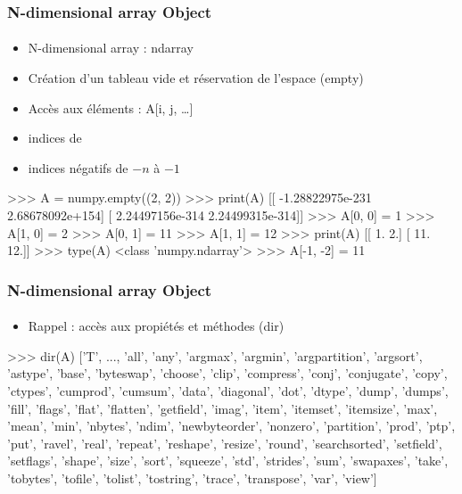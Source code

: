 \begin{frame}[fragile]
\frametitle{N-dimensional array Object}
\framesubtitle{}
\begin{itemize}
 \item N-dimensional array : ndarray
 \item Création d'un tableau vide et réservation de l'espace (empty)
 \item Accès aux éléments : A[i, j, \dots] 
 \item indices de {\color{red}{0 à $n-1$}}
 \item indices négatifs de $-n$ à $-1$
\end{itemize}
\begin{pythonConsole}

>>> A = numpy.empty((2, 2))
>>> print(A)
[[ -1.28822975e-231   2.68678092e+154]
 [  2.24497156e-314   2.24499315e-314]]
>>> A[0, 0] = 1
>>> A[1, 0] = 2
>>> A[0, 1] = 11
>>> A[1, 1] = 12
>>> print(A)
[[  1.   2.]
 [ 11.  12.]]
>>> type(A)
<class 'numpy.ndarray'>
>>> A[-1, -2] = 11
\end{pythonConsole}
\end{frame}
\begin{frame}[fragile]
\frametitle{N-dimensional array Object}
\framesubtitle{}
\begin{itemize}
 \item Rappel : accès aux propiétés et méthodes (dir) 
\end{itemize}
\begin{pythonConsole}

>>> dir(A)
['T', ..., 'all', 'any', 'argmax', 'argmin', 'argpartition', 'argsort', 
'astype', 'base', 'byteswap', 'choose', 'clip', 'compress', 'conj', 'conjugate',
'copy', 'ctypes', 'cumprod', 'cumsum', 'data', 'diagonal', 'dot', 'dtype',
'dump', 'dumps', 'fill', 'flags', 'flat', 'flatten', 'getfield', 'imag', 'item',
'itemset', 'itemsize', 'max', 'mean', 'min', 'nbytes', 'ndim', 'newbyteorder',
'nonzero', 'partition', 'prod', 'ptp', 'put', 'ravel', 'real', 'repeat',
'reshape', 'resize', 'round', 'searchsorted', 'setfield', 'setflags', 'shape',
'size', 'sort', 'squeeze', 'std', 'strides', 'sum', 'swapaxes', 'take',
'tobytes', 'tofile', 'tolist', 'tostring', 'trace', 'transpose', 'var', 'view']
\end{pythonConsole}
\end{frame}
